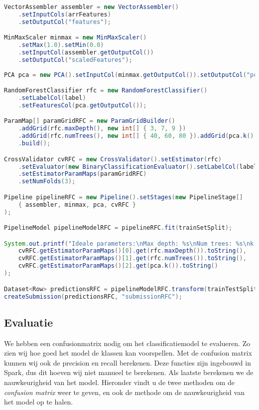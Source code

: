 \documentclass[a4paper,10pt,twoside]{report}
\begin{document}
\begin{lstlisting}[language=Java]
VectorAssembler assembler = new VectorAssembler()
	.setInputCols(arrFeatures)
	.setOutputCol("features");

MinMaxScaler minmax = new MinMaxScaler()
	.setMax(1.0).setMin(0.0)
	.setInputCol(assembler.getOutputCol())
	.setOutputCol("scaledFeatures");
	
PCA pca = new PCA().setInputCol(minmax.getOutputCol()).setOutputCol("pcaFeatures").setK(3);

RandomForestClassifier rfc = new RandomForestClassifier()
	.setLabelCol(label)
	.setFeaturesCol(pca.getOutputCol());

ParamMap[] paramGridRFC = new ParamGridBuilder()
	.addGrid(rfc.maxDepth(), new int[] { 3, 7, 9 })
	.addGrid(rfc.numTrees(), new int[] { 40, 60, 80 }).addGrid(pca.k(), new int[] { 3, 6, 9 })
	.build();

CrossValidator cvRFC = new CrossValidator().setEstimator(rfc)
	.setEvaluator(new BinaryClassificationEvaluator().setLabelCol(label))
	.setEstimatorParamMaps(paramGridRFC)
	.setNumFolds(3);

Pipeline pipelineRFC = new Pipeline().setStages(new PipelineStage[] 
	{ assembler, minmax, pca, cvRFC }
);

PipelineModel pipelineModelRFC = pipelineRFC.fit(trainSetSplit);

System.out.printf("Ideale parameters:\nMax depth: %s\nNum trees: %s\nk: %s", 	
	cvRFC.getEstimatorParamMaps()[0].get(rfc.maxDepth()).toString(),
	cvRFC.getEstimatorParamMaps()[1].get(rfc.numTrees()).toString(),
	cvRFC.getEstimatorParamMaps()[2].get(pca.k()).toString()
);

Dataset<Row> predictionsRFC = pipelineModelRFC.transform(trainTestSplit);
createSubmission(predictionsRFC, "submissionRFC");
\end{lstlisting}

\newpage

\subsection*{Evaluatie}

We hebben een confusionmatrix nodig om het classificatiemodel te evalueren. Zo zien wij hoe goed het model de klassen kan voorspellen. Met de confusion matrix kunnen wij ook de precision en recall berekenen. Deze functies zijn ingebouwd in Spark, dus dit hoeven wij niet manueel te berekenen. Als laatste berekenen we de nauwkeurigheid van het model. Hieronder vindt u de twee methoden om de \textit{confusion matrix} weer te geven, en ook de methode om de nauwkeurigheid van het model op te halen.
\end{document}
